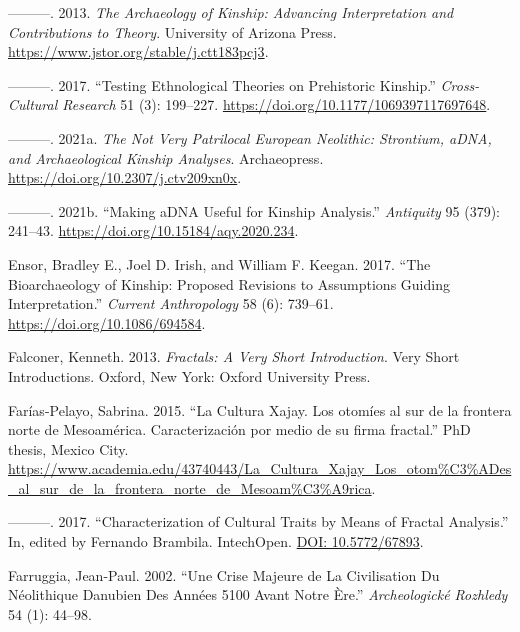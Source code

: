 \documentclass[
  12pt,
  a4paper, twoside]{book}
\newlength{\cslhangindent}
\newlength{\cslentryspacingunit} %
\newenvironment{CSLReferences}[2] %
 {%
  \setlength{\parindent}{0pt}
  \ifodd #1
  \let\oldpar\par
  \def\par{\hangindent=\cslhangindent\oldpar}
  \fi
  \setlength{\parskip}{#2\cslentryspacingunit}
 }%
 {}
\begin{document}
\begin{CSLReferences}{1}{0}
\leavevmode{}%
---------. 2013. \emph{The Archaeology of Kinship: Advancing Interpretation and Contributions to Theory}. University of Arizona Press. \url{https://www.jstor.org/stable/j.ctt183pcj3}.

\leavevmode{}%
---------. 2017. {``Testing Ethnological Theories on Prehistoric Kinship.''} \emph{Cross-Cultural Research} 51 (3): 199--227. \url{https://doi.org/10.1177/1069397117697648}.

\leavevmode{}%
---------. 2021a. \emph{The Not Very Patrilocal European Neolithic: Strontium, aDNA, and Archaeological Kinship Analyses}. Archaeopress. \url{https://doi.org/10.2307/j.ctv209xn0x}.

\leavevmode{}%
---------. 2021b. {``Making aDNA Useful for Kinship Analysis.''} \emph{Antiquity} 95 (379): 241--43. \url{https://doi.org/10.15184/aqy.2020.234}.

\leavevmode{}%
Ensor, Bradley E., Joel D. Irish, and William F. Keegan. 2017. {``The Bioarchaeology of Kinship: Proposed Revisions to Assumptions Guiding Interpretation.''} \emph{Current Anthropology} 58 (6): 739--61. \url{https://doi.org/10.1086/694584}.

\leavevmode{}%
Falconer, Kenneth. 2013. \emph{Fractals: A Very Short Introduction}. Very Short Introductions. Oxford, New York: Oxford University Press.

\leavevmode{}%
Farías-Pelayo, Sabrina. 2015. {``La Cultura Xajay. Los otomíes al sur de la frontera norte de Mesoamérica. Caracterización por medio de su firma fractal.''} PhD thesis, Mexico City. \url{https://www.academia.edu/43740443/La_Cultura_Xajay_Los_otom\%C3\%ADes_al_sur_de_la_frontera_norte_de_Mesoam\%C3\%A9rica}.

\leavevmode{}%
---------. 2017. {``Characterization of Cultural Traits by Means of Fractal Analysis.''} In, edited by Fernando Brambila. IntechOpen. \href{https://DOI:\%2010.5772/67893}{DOI: 10.5772/67893}.

\leavevmode{}%
Farruggia, Jean-Paul. 2002. {``Une Crise Majeure de La Civilisation Du Néolithique Danubien Des Années 5100 Avant Notre Ère.''} \emph{Archeologické Rozhledy} 54 (1): 44--98.


\end{CSLReferences}
\end{document}
